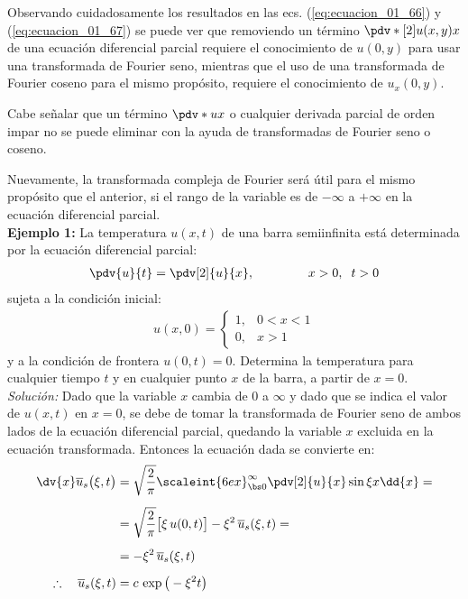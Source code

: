 Observando cuidadosamente los resultados en las ecs. (\ref{eq:ecuacion_01_66}) y (\ref{eq:ecuacion_01_67}) se puede ver que removiendo un término $\pdv*[2]{u(x, y)}{x}$ de una ecuación diferencial parcial requiere el conocimiento de $u (0, y)$ para usar una transformada de Fourier seno, mientras que el uso de una transformada de Fourier coseno para el mismo propósito, requiere el conocimiento de $u_{x} (0, y)$.
\par
Cabe señalar que un término $\pdv*{u}{x}$ o cualquier derivada parcial de orden impar no se puede eliminar con la ayuda de transformadas de Fourier seno o coseno.
\par
Nuevamente, la transformada compleja de Fourier será útil para el mismo propósito que el anterior, si el rango de la variable es de $- \infty$ a $+ \infty$ en la ecuación diferencial parcial.
\\[0.5cm]
\noindent
\textbf{Ejemplo 1: } La temperatura $u (x, t)$ de una barra semiinfinita está determinada por la ecuación diferencial parcial:
\begin{align*}
\pdv{u}{t} = \pdv[2]{u}{x}, \hspace{1.5cm} x > 0, \hspace{0.2cm} t > 0
\end{align*}
sujeta a la condición inicial:
\begin{align*}
u(x, 0) = \begin{cases}
1, & 0 < x < 1 \\
0, & x > 1
\end{cases}
\end{align*}
y a la condición de frontera $u(0, t) = 0$. Determina la temperatura para cualquier tiempo $t$ y en cualquier punto $x$ de la barra, a partir de $x = 0$.
\\[0.5em]
\textit{Solución:} Dado que la variable $x$ cambia de $0$ a $\infty$ y dado que se indica el valor de $u (x, t)$ en $x = 0$, se debe de tomar la transformada de Fourier seno de ambos lados de la ecuación diferencial parcial, quedando la variable $x$ excluida en la ecuación transformada. Entonces la ecuación dada se convierte en:
\begin{align}
\begin{aligned}[b]
\dv{x} \overline{u}_{s} \big( \xi, t \big) &= \sqrt{\dfrac{2}{\pi}} \scaleint{6ex}_{\bs 0}^{\infty} \pdv[2]{u}{x} \sin \xi x \dd{x} = \\[0.5em]
&= \sqrt{\dfrac{2}{\pi}} \big[ \xi \, u(0, t) \big] - \xi^{2} \, \overline{u}_{s} (\xi, t) = \\[0.5em]
&= - \xi^{2} \, \overline{u}_{s} (\xi, t) \\[0.5em]
\therefore \quad \overline{u}_{s} (\xi, t) &= c \, \exp\big( - \xi^{2} t \big)
\end{aligned}
\label{eq:ecuacion_ejemplo_01_i}
\end{align}
